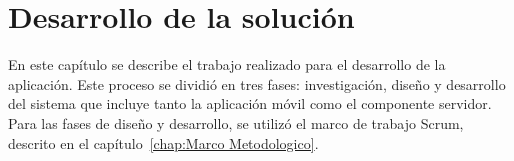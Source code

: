\chapter{Desarrollo de la solución} \label{chapter:Desarrollo de la aplicacion}

En este capítulo se describe el trabajo realizado para el desarrollo de la aplicación. Este proceso se dividió en tres fases: investigación, diseño y desarrollo del sistema que incluye tanto la aplicación móvil como el componente servidor. Para las fases de diseño y desarrollo, se utilizó el marco de trabajo Scrum, descrito en el capítulo~\ref{chap:Marco Metodologico}.
